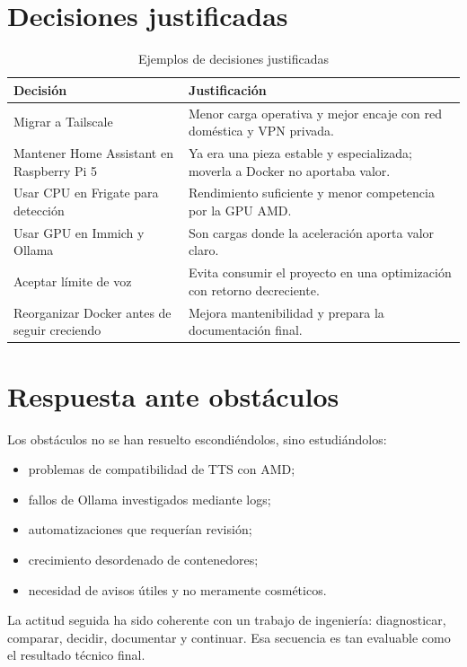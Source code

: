 \section{Decisiones justificadas}
\begin{table}[H]
  \centering
  \caption{Ejemplos de decisiones justificadas}
  \label{tab:decisiones-justificadas}
  \begin{tabularx}{\textwidth}{lX}
    \toprule
    Decisión & Justificación \\
    \midrule
    Migrar a Tailscale & Menor carga operativa y mejor encaje con red doméstica y VPN privada. \\
    Mantener Home Assistant en Raspberry Pi 5 & Ya era una pieza estable y especializada; moverla a Docker no aportaba valor. \\
    Usar CPU en Frigate para detección & Rendimiento suficiente y menor competencia por la GPU AMD. \\
    Usar GPU en Immich y Ollama & Son cargas donde la aceleración aporta valor claro. \\
    Aceptar límite de voz & Evita consumir el proyecto en una optimización con retorno decreciente. \\
    Reorganizar Docker antes de seguir creciendo & Mejora mantenibilidad y prepara la documentación final. \\
    \bottomrule
  \end{tabularx}
\end{table}

\section{Respuesta ante obstáculos}
Los obstáculos no se han resuelto escondiéndolos, sino estudiándolos:
\begin{itemize}
  \item problemas de compatibilidad de TTS con AMD;
  \item fallos de Ollama investigados mediante logs;
  \item automatizaciones que requerían revisión;
  \item crecimiento desordenado de contenedores;
  \item necesidad de avisos útiles y no meramente cosméticos.
\end{itemize}

La actitud seguida ha sido coherente con un trabajo de ingeniería: diagnosticar, comparar, decidir, documentar y continuar. Esa secuencia es tan evaluable como el resultado técnico final.

